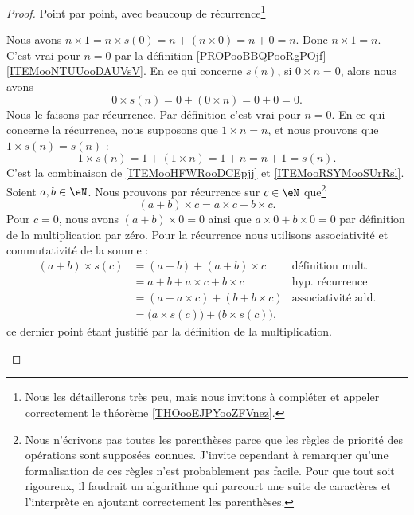 \begin{proof}
	Point par point, avec beaucoup de récurrence\footnote{Nous les détaillerons très peu, mais nous invitons  à compléter et appeler correctement le théorème \ref{THOooEJPYooZFVnez}.}
	\begin{subproof}
		Nous avons \( n\times 1=n\times s(0)=n + (n\times 0) = n + 0 = n\). Donc \( n\times 1=n\).
		C'est vrai pour \( n=0\) par la définition \ref{PROPooBBQPooRgPOjf}\ref{ITEMooNTUUooDAUVsV}. En ce qui concerne \( s(n)\), si \( 0 \times n = 0\), alors nous avons
		\begin{equation}
			0\times s(n) = 0+(0\times n) = 0+0 = 0.
		\end{equation}
		Nous le faisons par récurrence. Par définition c'est vrai pour \( n=0\). En ce qui concerne la récurrence, nous supposons que \( 1\times n=n\), et nous prouvons que \( 1\times s(n)=s(n)\) :
		\begin{equation}
			1\times s(n) = 1+(1\times n) = 1 + n = n + 1 = s(n).
		\end{equation}
		C'est la combinaison de \ref{ITEMooHFWRooDCEpjj} et \ref{ITEMooRSYMooSUrRsl}.
		Soient \( a,b\in \eN\). Nous prouvons par récurrence sur \( c\in \eN\) que\footnote{Nous n'écrivons pas toutes les parenthèses parce que les règles de priorité des opérations sont supposées connues. J'invite cependant  à remarquer qu'une formalisation de ces règles n'est probablement pas facile. Pour que tout soit rigoureux, il faudrait un algorithme qui parcourt une suite de caractères et l'interprète en ajoutant correctement les parenthèses.}
		\begin{equation}
			(a+b)\times c=a\times c+b\times c.
		\end{equation}
		Pour \( c=0\), nous avons \( (a+b)\times 0=0\) ainsi que \( a\times 0 + b\times 0=0\) par définition de la multiplication par zéro. Pour la récurrence nous utilisons associativité et commutativité de la somme :
		\begin{align}
			(a+b)\times s(c) & =(a+b) + (a+b)\times c              &\text{définition mult.}                \\
			                 & =a + b + a\times c + b\times c      &\text{hyp. récurrence}                 \\
			                 & =(a + a\times c)+(b + b\times c)    &\text{associativité add.}              \\
			                 & =\big( a\times s(c) \big)+\big( b\times s(c) \big),
		\end{align}
  		ce dernier point étant justifié par la définition de la multiplication.
	

\end{subproof}
\end{proof}
